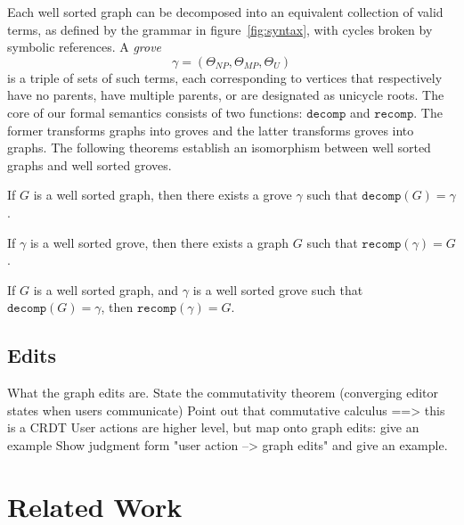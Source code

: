\documentclass[nonacm, acmsmall, screen, review]{acmart}
\newcommand{\decompOp}{\texttt{decomp}}
\newcommand{\recompOp}{\texttt{recomp}}
\newcommand{\decomp}[1]{\decompOp\mathopen{}\left(#1\right)\mathclose{}}
\newcommand{\recomp}[1]{\recompOp\mathopen{}\left(#1\right)\mathclose{}}
\begin{document}
Each well sorted graph can be decomposed into an equivalent collection of valid terms, as defined by the grammar in figure~\ref{fig:syntax}, with cycles broken by symbolic references.
A \emph{grove} \[\gamma = (\Theta_{NP}, \Theta_{MP}, \Theta_{U})\] is a triple of sets of such terms, each corresponding to vertices that respectively have no parents, have multiple parents, or are designated as unicycle roots.
The core of our formal semantics consists of two functions: $\decompOp$ and $\recompOp$.
The former transforms graphs into groves and
the latter transforms groves into graphs.
The following theorems establish an isomorphism between well sorted graphs and well sorted groves.
%
\begin{theorem}
  If $G$ is a well sorted graph,
  then there exists a grove $\gamma$ such that $\decomp{G} = \gamma$.
\end{theorem}
%
\begin{theorem}
  If $\gamma$ is a well sorted grove,
  then there exists a graph $G$ such that $\recomp{\gamma} = G$.
\end{theorem}
%
\begin{theorem}
  If $G$ is a well sorted graph,
  and $\gamma$ is a well sorted grove such that $\decomp{G} = \gamma$,
  then $\recomp{\gamma} = G$.
\end{theorem}


\subsection{Edits}
What the graph edits are.
State the commutativity theorem (converging editor states when users communicate)
Point out that commutative calculus ==> this is a CRDT
User actions are higher level, but map onto graph edits: give an example
Show judgment form "user action --> graph edits" and give an example.




\section{Related Work}
\label{sec:related-work}
\end{document}
